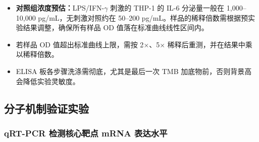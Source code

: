 \documentclass[12pt,a4paper,twoside]{article}
\begin{document}
\begin{warningbox}
\begin{itemize}
  \item \textbf{对照组浓度预估：}LPS/IFN-$\gamma$ 刺激的 THP-1 的 IL-6 分泌量一般在 1,000--10,000 pg/mL，无刺激对照约在 50--200 pg/mL。样品的稀释倍数需根据预实验结果调整，确保所有样品 OD 值落在标准曲线线性区间内。
  \item 若样品 OD 值超出标准曲线上限，需按 2$\times$、5$\times$ 稀释后重测，并在结果中乘以稀释倍数。
  \item ELISA 板各步骤洗涤需彻底，尤其是最后一次 TMB 加底物前，否则背景高会降低实验灵敏度。
\end{itemize}
\end{warningbox}

\subsection{分子机制验证实验}
\label{sec:module6_mechanism}

\subsubsection{qRT-PCR 检测核心靶点 mRNA 表达水平}
\end{document}
